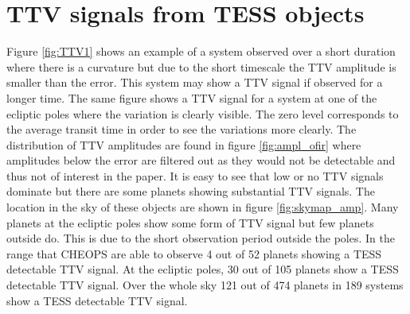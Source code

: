 \documentclass[12pt]{report}
\begin{document}
\section{TTV signals from TESS objects}
	Figure \ref{fig:TTV1} shows an example of a system observed over a short duration where there is a curvature but due to the short timescale the TTV amplitude is smaller than the error. This system may show a TTV signal if observed for a longer time. The same figure shows a TTV signal for a system at one of the ecliptic poles where the variation is clearly visible. The zero level corresponds to the average transit time in order to see the variations more clearly. The distribution of TTV amplitudes are found in figure \ref{fig:ampl_ofir} where amplitudes below the error are filtered out as they would not be detectable and thus not of interest in the paper. It is easy to see that low or no TTV signals dominate but there are some planets showing substantial TTV signals. The location in the sky of these objects are shown in figure \ref{fig:skymap_amp}. Many planets at the ecliptic poles show some form of TTV signal but few planets outside do. This is due to the short observation period outside the poles. In the range that CHEOPS are able to observe 4 out of 52 planets showing a TESS detectable TTV signal. At the ecliptic poles, 30 out of 105 planets show a TESS detectable TTV signal. Over the whole sky 121 out of 474 planets in 189 systems show a TESS detectable TTV signal. 
	
\end{document}
